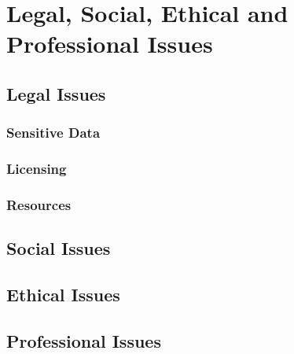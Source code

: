 \chapter{Legal, Social, Ethical and Professional Issues}
\label{Chapter:Issues}

\section{Legal Issues}
\subsection{Sensitive Data}
\subsection{Licensing}
\subsection{Resources}

\section{Social Issues}

\section{Ethical Issues}

\section{Professional Issues}